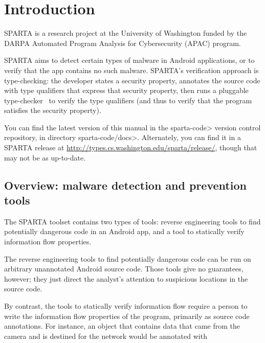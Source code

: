 \htmlhr
\chapter{Introduction\label{introduction}}

SPARTA is a research project at the University of Washington funded by the DARPA
 Automated Program Analysis for Cybersecurity (APAC) program.


SPARTA aims to detect certain types of malware in Android applications, or
to verify that the app contains no such malware.  SPARTA's verification
approach is type-checking:  the developer states a security property,
annotates the source code with type qualifiers that express that security
property, then runs a pluggable type-checker~\cite{PapiACPE2008,DietlDEMS2011} to verify the type
qualifiers (and thus to verify that the program satisfies the security
property).




You can find the latest version of this manual in the \<sparta-code> version
control repository, in directory \<sparta-code/docs>.  Alternately, you can
find it in a SPARTA release at
\url{http://types.cs.washington.edu/sparta/release/}, though that may not
be as up-to-date.


\section{Overview:  malware detection and prevention tools}

The SPARTA toolset contains two types of tools:  reverse engineering tools to find potentially
dangerous code in an Android app, and a tool to statically verify
information flow properties.

The reverse engineering tools to find potentially dangerous code can be run on
arbitrary unannotated Android source code.  Those tools give no guarantees,
however; they just direct the analyst's attention to suspicious locations
in the source code.

By contrast, the tools to statically verify information flow require a person to write
the information flow properties of the program, primarily as source code
annotations.  For instance, an object  that contains data that came from the
camera and is destined for the network would be annotated with 


